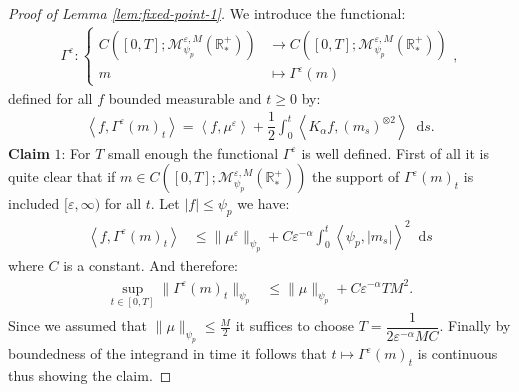 \documentclass[11pt,a4paper]{article}
\newcommand{\RRP}{\mathbb{R}^+_*}
\newcommand{\MC}{\mathcal{M}}
\newcommand{\brac}[1]{\left\langle#1\right\rangle}
\newcommand{\dd}{\mathop{}\!\mathrm{d}}
\begin{document}
\begin{proof}[Proof of Lemma \ref{lem:fixed-point-1}]
    We introduce the functional:
    \begin{align*}
    \Gamma^\varepsilon : 
    \left\lbrace 
    \begin{aligned}
        C\left([0,T];\MC^{\varepsilon,M}_{\psi_p}(\RRP) \right) &\to C\left([0,T];\MC^{\varepsilon,M}_{\psi_p}(\RRP) \right)\\
         m & \mapsto \Gamma^\varepsilon(m)
    \end{aligned}
    \right.,
    \end{align*}
    defined for all $f$ bounded measurable and $t \geq 0$ by:
    \begin{align*}
        \brac{f,\Gamma^\varepsilon(m)_t}= \brac{f,\mu^\varepsilon} + \dfrac12\int_0^t \brac{K_\alpha f,\left(m_s\right)^{\otimes 2}} \dd s.
    \end{align*}
    \textbf{Claim} $1$: For $T$ small enough the functional $\Gamma^\varepsilon$ is well defined. First of all it is quite clear that if $m \in C\left([0,T];\MC^{\varepsilon,M}_{\psi_p}(\RRP) \right)$ the support of $\Gamma^\varepsilon(m)_t$ is included $[\varepsilon,\infty)$ for all $t$. Let $|f| \leq \psi_p$ we have:
    \begin{align*}
        \brac{f,\Gamma^\varepsilon(m)_t} &\leq \|\mu^\varepsilon\|_{\psi_p} + C\varepsilon^{-\alpha}\int_0^t \brac{\psi_p,|m_s|}^2 \dd s 
    \end{align*}
    where $C$ is a constant. And therefore:
    \begin{align*}
        \sup\limits_{t\in [0,T]} \| \Gamma^\varepsilon(m)_t\|_{\psi_p} 
        &\leq \|\mu\|_{\psi_p} + C\varepsilon^{-\alpha} T M^2.
    \end{align*}
    Since we assumed that $\|\mu\|_{\psi_p} \leq \frac{M}{2}$ it suffices to choose $T = \dfrac{1}{2\varepsilon^{-\alpha}MC}$. Finally by boundedness of the integrand in time it follows that $t \mapsto \Gamma^\varepsilon(m)_t$ is continuous thus showing the claim.


\end{proof}
\end{document}
